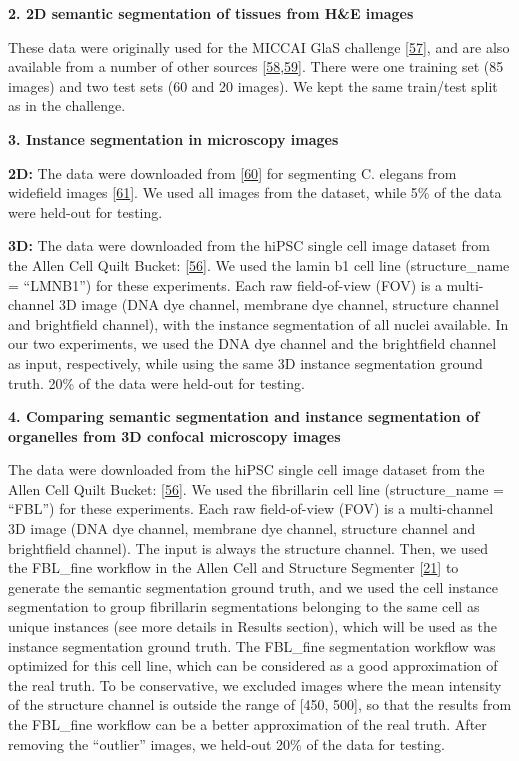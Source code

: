\textbf{2. 2D semantic segmentation of tissues from H\&E images}

These data were originally used for the MICCAI GlaS challenge {[}\protect\hyperlink{ref-ZmNLyDRf}{57}{]}, and are also available from a number of other sources {[}\protect\hyperlink{ref-GCuzvG4m}{58},\protect\hyperlink{ref-1ClIGtR4D}{59}{]}. There were one training set (85 images) and two test sets (60 and 20 images). We kept the same train/test split as in the challenge.

\textbf{3. Instance segmentation in microscopy images}

\textbf{2D:} The data were downloaded from {[}\protect\hyperlink{ref-zvJ4kB9e}{60}{]} for segmenting C. elegans from widefield images {[}\protect\hyperlink{ref-wJGDcP0t}{61}{]}. We used all images from the dataset, while 5\% of the data were held-out for testing.

\textbf{3D:} The data were downloaded from the hiPSC single cell image dataset from the Allen Cell Quilt Bucket: {[}\protect\hyperlink{ref-vm45dW9e}{56}{]}. We used the lamin b1 cell line (structure\_name = ``LMNB1'') for these experiments. Each raw field-of-view (FOV) is a multi-channel 3D image (DNA dye channel, membrane dye channel, structure channel and brightfield channel), with the instance segmentation of all nuclei available. In our two experiments, we used the DNA dye channel and the brightfield channel as input, respectively, while using the same 3D instance segmentation ground truth. 20\% of the data were held-out for testing.

\textbf{4. Comparing semantic segmentation and instance segmentation of organelles from 3D confocal microscopy images}

The data were downloaded from the hiPSC single cell image dataset from the Allen Cell Quilt Bucket: {[}\protect\hyperlink{ref-vm45dW9e}{56}{]}. We used the fibrillarin cell line (structure\_name = ``FBL'') for these experiments. Each raw field-of-view (FOV) is a multi-channel 3D image (DNA dye channel, membrane dye channel, structure channel and brightfield channel). The input is always the structure channel. Then, we used the FBL\_fine workflow in the Allen Cell and Structure Segmenter {[}\protect\hyperlink{ref-jM3v1UjQ}{21}{]} to generate the semantic segmentation ground truth, and we used the cell instance segmentation to group fibrillarin segmentations belonging to the same cell as unique instances (see more details in Results section), which will be used as the instance segmentation ground truth. The FBL\_fine segmentation workflow was optimized for this cell line, which can be considered as a good approximation of the real truth. To be conservative, we excluded images where the mean intensity of the structure channel is outside the range of {[}450, 500{]}, so that the results from the FBL\_fine workflow can be a better approximation of the real truth. After removing the ``outlier'' images, we held-out 20\% of the data for testing.

